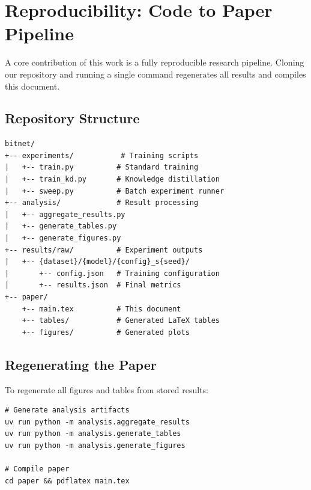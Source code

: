 \documentclass[10pt]{article}
\begin{document}




\appendix

\section{Reproducibility: Code to Paper Pipeline}
\label{app:reproducibility}

A core contribution of this work is a fully reproducible research pipeline. Cloning our repository and running a single command regenerates all results and compiles this document.

\subsection{Repository Structure}

\begin{verbatim}
bitnet/
+-- experiments/           # Training scripts
|   +-- train.py          # Standard training
|   +-- train_kd.py       # Knowledge distillation
|   +-- sweep.py          # Batch experiment runner
+-- analysis/             # Result processing
|   +-- aggregate_results.py
|   +-- generate_tables.py
|   +-- generate_figures.py
+-- results/raw/          # Experiment outputs
|   +-- {dataset}/{model}/{config}_s{seed}/
|       +-- config.json   # Training configuration
|       +-- results.json  # Final metrics
+-- paper/
    +-- main.tex          # This document
    +-- tables/           # Generated LaTeX tables
    +-- figures/          # Generated plots
\end{verbatim}

\subsection{Regenerating the Paper}

To regenerate all figures and tables from stored results:
\begin{verbatim}
# Generate analysis artifacts
uv run python -m analysis.aggregate_results
uv run python -m analysis.generate_tables
uv run python -m analysis.generate_figures

# Compile paper
cd paper && pdflatex main.tex
\end{verbatim}
\end{document}
